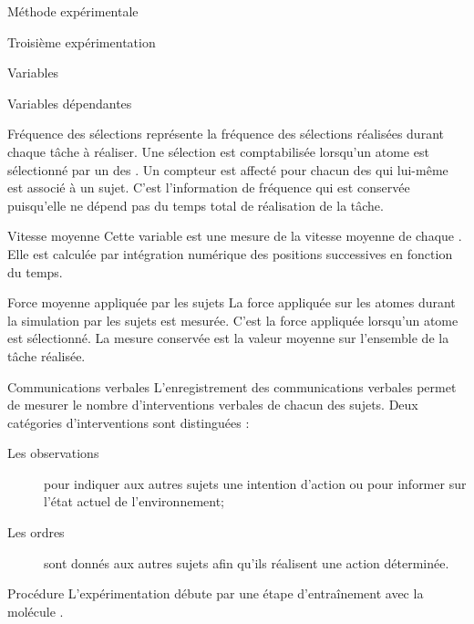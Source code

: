 \documentclass[myfrancais]{mythesis}
\begin{document}
\begin{mychapter}{Méthode expérimentale}
\begin{mysection}{Troisième expérimentation}
\begin{mysubsection}{Variables}
\begin{mysubsubsection}{Variables dépendantes}
					\begin{myparagraph}{ Fréquence des sélections}
						 représente la fréquence des sélections réalisées durant chaque tâche à réaliser.
						Une sélection est comptabilisée lorsqu'un atome est sélectionné par un des .
						Un compteur est affecté pour chacun des  qui lui-même est associé à un sujet.
						C'est l'information de fréquence qui est conservée puisqu'elle ne dépend pas du temps total de réalisation de la tâche.
					\end{myparagraph}
					\begin{myparagraph}{ Vitesse moyenne}
						Cette variable est une mesure de la vitesse moyenne de chaque .
						Elle est calculée par intégration numérique des positions successives en fonction du temps.
					\end{myparagraph}
					\begin{myparagraph}{ Force moyenne appliquée par les sujets}
						La force appliquée sur les atomes durant la simulation par les sujets est mesurée.
						C'est la force appliquée lorsqu'un atome est sélectionné.
						La mesure conservée est la valeur moyenne sur l'ensemble de la tâche réalisée.
					\end{myparagraph}
					\begin{myparagraph}{ Communications verbales}
						L'enregistrement des communications verbales permet de mesurer le nombre d'interventions verbales de chacun des sujets.
						Deux catégories d'interventions sont distinguées :
						\begin{description}
							\item[Les observations] pour indiquer aux autres sujets une intention d'action ou pour informer sur l'état actuel de l'environnement;
							\item[Les ordres] sont donnés aux autres sujets afin qu'ils réalisent une action déterminée.
						\end{description}
					\end{myparagraph}
				\end{mysubsubsection}
			\end{mysubsection}
			\begin{mysubsection}{Procédure}
				L'expérimentation débute par une étape d'entraînement avec la molécule \myTRPCAGE.

\end{mysubsection}
\end{mysection}
\end{mychapter}
\end{document}
